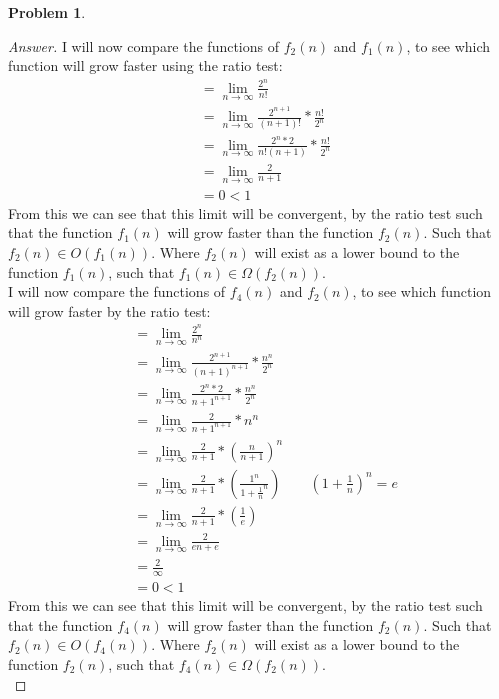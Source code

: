 \documentclass[11pt]{article}
\theoremstyle{definition}
\theoremstyle{definition}
\newtheorem{required}{Problem}
\theoremstyle{definition}
\begin{document}
\begin{required}
\begin{enumerate}[label=(\alph*)]
\begin{proof}[Answer]
I will now compare the functions of $f_2(n)$ and $f_1(n)$, to see which function will grow faster using the ratio test: \\
\begin{align*}
&= \lim_{n \to \infty} \frac{2^{n}}{n!} \\
&= \lim_{n \to \infty} \frac{2^{n+1}}{(n+1)!} * \frac{n!}{2^{n}} \\
&= \lim_{n \to \infty} \frac{2^{n} * 2}{n!(n+1)} * \frac{n!}{2^{n}} \\
&= \lim_{n \to \infty} \frac{2}{n+1}\\
&= 0 < 1
\end{align*} 
From this we can see that this limit will be convergent, by the ratio test such that the function $f_1(n)$  will grow faster than the function $f_2(n)$. Such that $f_2(n) \in O(f_1(n))$. Where $f_2(n)$ will exist as a lower bound to the function $f_1(n)$, such that $f_1(n) \in \Omega(f_2(n))$. \\

I will now compare the functions of $f_4(n)$ and $f_2(n)$, to see which function will grow faster by the ratio test: \\
\begin{align*}
&= \lim_{n \to \infty} \frac{2^{n}}{n^{n}} \\
&= \lim_{n \to \infty} \frac{2^{n+1}}{(n+1)^{n+1}} * \frac{n^{n}}{2^{n}} \\
&= \lim_{n \to \infty} \frac{2^{n} * 2}{n+1^{n+1}} * \frac{n^{n}}{2^{n}} \\
&= \lim_{n \to \infty} \frac{2}{n+1^{n+1}} * n^{n} \\
&= \lim_{n \to \infty} \frac{2}{n+1} * (\frac{n}{n+1})^{n} \\
&= \lim_{n \to \infty} \frac{2}{n+1} * (\frac{1^{n}}{1+\frac{1}{n}^{n}}) \qquad (1+\frac{1}{n})^{n} = e \\
&= \lim_{n \to \infty} \frac{2}{n+1} * (\frac{1}{e}) \\
&= \lim_{n \to \infty} \frac{2}{en+e} \\
&= \frac{2}{\infty} \\
&= 0 < 1
\end{align*}
From this we can see that this limit will be convergent, by the ratio test such that the function $f_4(n)$ will grow faster than the function $f_2(n)$. Such that $f_2(n) \in O(f_4(n))$. Where $f_2(n)$ will exist as a lower bound to the function $f_2(n)$, such that  $f_4(n) \in \Omega(f_2(n))$. \\


\end{proof}
\end{enumerate}
\end{required}
\end{document}
